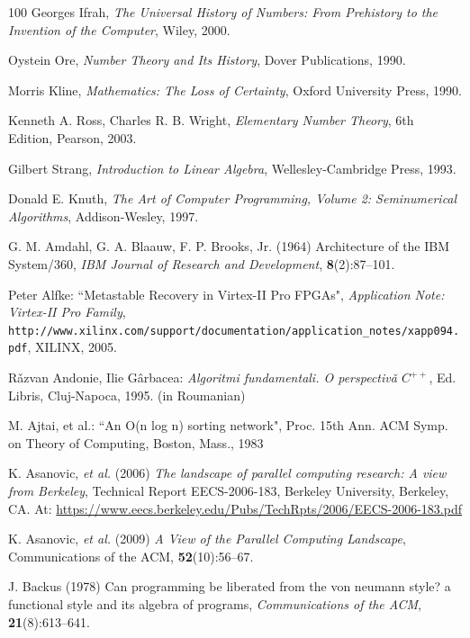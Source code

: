\begin{thebibliography}{100}
Georges Ifrah, \textit{The Universal History of Numbers: From Prehistory to the Invention of the Computer}, Wiley, 2000.

Oystein Ore, \textit{Number Theory and Its History}, Dover Publications, 1990.

Morris Kline, \textit{Mathematics: The Loss of Certainty}, Oxford University Press, 1990.

Kenneth A. Ross, Charles R. B. Wright, \textit{Elementary Number Theory}, 6th Edition, Pearson, 2003.

Gilbert Strang, \textit{Introduction to Linear Algebra}, Wellesley-Cambridge Press, 1993.

Donald E. Knuth, \textit{The Art of Computer Programming, Volume 2: Seminumerical Algorithms}, Addison-Wesley, 1997.



 G. M. Amdahl, G. A. Blaauw, F. P. Brooks, Jr. (1964)  Architecture of the IBM System/360, {\em IBM Journal of Research and Development}, {\bf 8}(2):87--101.

 Peter Alfke: ``Metastable Recovery in Virtex-II Pro FPGAs", {\em Application Note: Virtex-II Pro Family}, {\tt http://www.xilinx.com/support/documentation/application\_notes/xapp094.pdf}, XILINX, 2005.

\bibitem[Andonie '95]{} R\v azvan Andonie, Ilie G\^{a}rbacea: {\em Algoritmi fundamentali. O perspectiv\v a $C^{++}$}, Ed. Libris, Cluj-Napoca, 1995. (in Roumanian)

 M. Ajtai, et al.: ``An O(n log n) sorting network", Proc. 15th Ann. ACM Symp. on Theory of Computing, Boston, Mass., 1983

 K. Asanovic, {\em et al.} (2006) {\em The landscape of parallel computing research: A view from Berkeley}, Technical Report EECS-2006-183, Berkeley University, Berkeley, CA. At: \url{https://www.eecs.berkeley.edu/Pubs/TechRpts/2006/EECS-2006-183.pdf}

 K. Asanovic,  {\em et al.} (2009) {\em A View of the Parallel Computing Landscape}, Communications of the
    ACM, {\bf 52}(10):56--67.

 J. Backus (1978) Can programming be liberated from the von neumann style? a functional style and its algebra of programs, {\em Communications of the ACM}, {\bf 21}(8):613--641.


\end{thebibliography}

